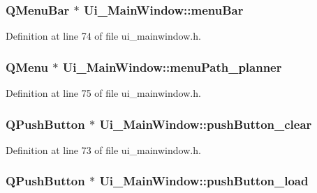 \subsubsection[{\texorpdfstring{menu\+Bar}{menuBar}}]{\setlength{\rightskip}{0pt plus 5cm}Q\+Menu\+Bar $\ast$ Ui\+\_\+\+Main\+Window\+::menu\+Bar}\hypertarget{class_ui___main_window_a502a50d7dc22415f511336bdfb4318b9}{}\label{class_ui___main_window_a502a50d7dc22415f511336bdfb4318b9}


Definition at line 74 of file ui\+\_\+mainwindow.\+h.

\subsubsection[{\texorpdfstring{menu\+Path\+\_\+planner}{menuPath_planner}}]{\setlength{\rightskip}{0pt plus 5cm}Q\+Menu $\ast$ Ui\+\_\+\+Main\+Window\+::menu\+Path\+\_\+planner}\hypertarget{class_ui___main_window_aa8cacbdd31a96faf5d84ac4ae1ed81c2}{}\label{class_ui___main_window_aa8cacbdd31a96faf5d84ac4ae1ed81c2}


Definition at line 75 of file ui\+\_\+mainwindow.\+h.

\subsubsection[{\texorpdfstring{push\+Button\+\_\+clear}{pushButton_clear}}]{\setlength{\rightskip}{0pt plus 5cm}Q\+Push\+Button $\ast$ Ui\+\_\+\+Main\+Window\+::push\+Button\+\_\+clear}\hypertarget{class_ui___main_window_a998e69440f8dc71bc9af3d93b1b2a2eb}{}\label{class_ui___main_window_a998e69440f8dc71bc9af3d93b1b2a2eb}


Definition at line 73 of file ui\+\_\+mainwindow.\+h.

\subsubsection[{\texorpdfstring{push\+Button\+\_\+load}{pushButton_load}}]{\setlength{\rightskip}{0pt plus 5cm}Q\+Push\+Button $\ast$ Ui\+\_\+\+Main\+Window\+::push\+Button\+\_\+load}\hypertarget{class_ui___main_window_a7dfcc1baa1cf9f418a04bd362569b5de}{}\label{class_ui___main_window_a7dfcc1baa1cf9f418a04bd362569b5de}


